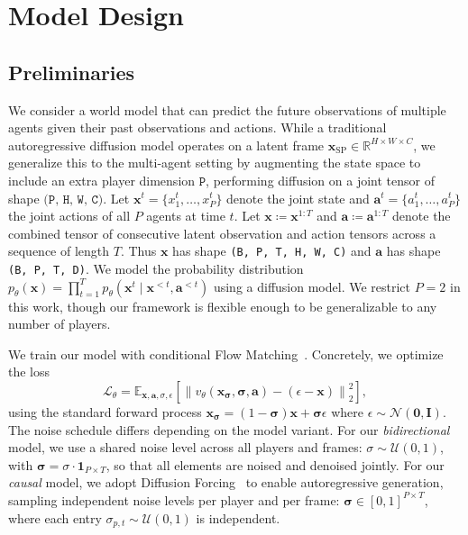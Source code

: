 


\section{\solaris Model Design}
\label{sec:solaris_model}

\subsection{Preliminaries}
We consider a world model that can predict the future observations of multiple agents given their past observations and actions. While a traditional autoregressive diffusion model operates on a latent frame $\mathbf{x}_{\text{SP}} \in \mathbb{R}^{H \times W \times C}$, we generalize this to the multi-agent setting by augmenting the state space to include an extra player dimension $\texttt{P}$, performing diffusion on a joint tensor of shape $\texttt{(P, H, W, C)}$. Let $\mathbf{x}^t = \{x_1^t, \dots, x_P^t\}$ denote the joint state and $\mathbf{a}^{t} = \{a_1^t, \dots, a_P^t\}$ the joint actions of all $P$ agents at time $t$. Let $\mathbf{x} \coloneqq \mathbf{x}^{1:T}$ and $\mathbf{a} \coloneqq \mathbf{a}^{1:T}$ denote the combined tensor of consecutive latent observation and action tensors across a sequence of length $T$. Thus $\mathbf{x}$ has shape \texttt{(B, P, T, H, W, C)} and $\mathbf{a}$ has shape \texttt{(B, P, T, D)}. We model the probability distribution $p_\theta(\mathbf{x}) = \prod_{t=1}^{T} p_\theta(\mathbf{x}^t \mid \mathbf{x}^{<t}, \mathbf{a}^{<t})$ using a diffusion model. We restrict $P=2$ in this work, though our framework is flexible enough to be generalizable to any number of players.


We train our model with conditional Flow Matching~\cite{liu2022flow,lipman2022flow}. Concretely, we optimize the loss
\[
\mathcal{L}_\theta = \mathbb{E}_{\mathbf{x}, \mathbf{a},\sigma, \epsilon} \left[ \left\| v_\theta(\mathbf{x}_{\boldsymbol{\sigma}}, \boldsymbol{\sigma}, \mathbf{a}) - (\epsilon - \mathbf{x}) \right\|_2^2 \right],
\]
using the standard forward process $\mathbf{x}_{\boldsymbol{\sigma}} = (1 - \boldsymbol{\sigma})\mathbf{x} + \boldsymbol{\sigma}\epsilon$ where $\epsilon\sim \mathcal{N}(\mathbf{0}, \mathbf{I})$. The noise schedule differs depending on the model variant. For our \emph{bidirectional} model, we use a shared noise level across all players and frames: $\sigma \sim \mathcal{U}(0, 1)$, with $\boldsymbol{\sigma} = \sigma \cdot \mathbf{1}_{ P \times T}$, so that all elements are noised and denoised jointly. For our \emph{causal} model, we adopt Diffusion Forcing~\cite{chen2024diffusionforcingnexttokenprediction} to enable autoregressive generation, sampling independent noise levels per player and per frame: $\boldsymbol{\sigma} \in [0, 1]^{P \times T}$, where each entry $\sigma_{p,t} \sim \mathcal{U}(0, 1)$ is independent. 




